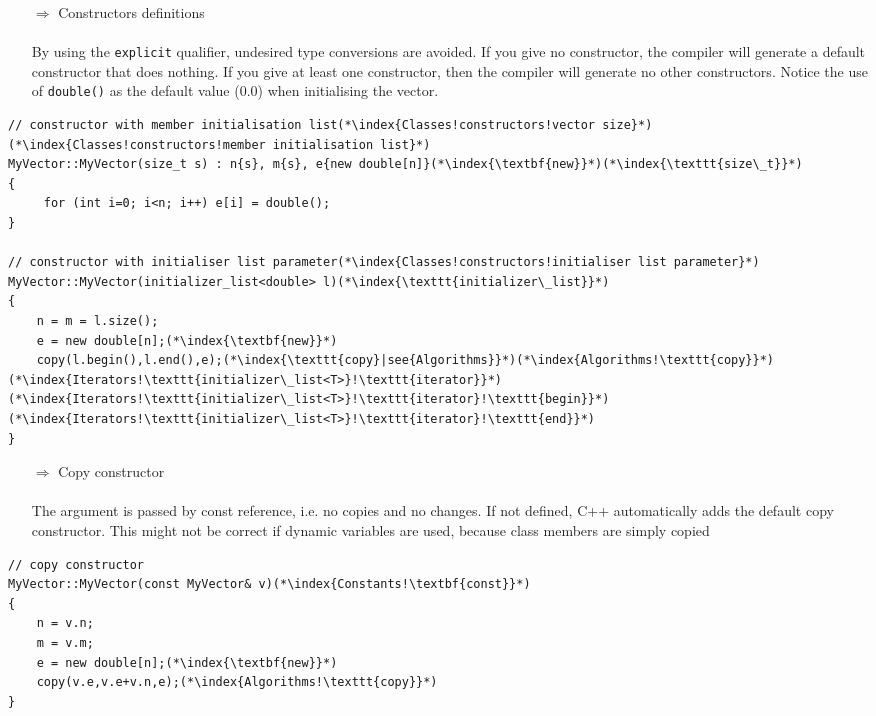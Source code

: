 \documentclass[10pt]{article}
\begin{document}
\begin{enumerate}
\item[$\Rightarrow$] Constructors definitions\\ \\ By using the \texttt{explicit} qualifier, undesired type conversions are avoided. If you give no constructor, the compiler will generate a default constructor that does nothing.
If you give at least one constructor, then the compiler will generate no other constructors. Notice the use of \texttt{double()} as the default value (0.0)
when initialising the vector.
\end{enumerate}
\begin{lstlisting}
// constructor with member initialisation list(*\index{Classes!constructors!vector size}*)(*\index{Classes!constructors!member initialisation list}*)
MyVector::MyVector(size_t s) : n{s}, m{s}, e{new double[n]}(*\index{\textbf{new}}*)(*\index{\texttt{size\_t}}*)
{
     for (int i=0; i<n; i++) e[i] = double();
}

// constructor with initialiser list parameter(*\index{Classes!constructors!initialiser list parameter}*)
MyVector::MyVector(initializer_list<double> l)(*\index{\texttt{initializer\_list}}*)
{
    n = m = l.size();
    e = new double[n];(*\index{\textbf{new}}*)
    copy(l.begin(),l.end(),e);(*\index{\texttt{copy}|see{Algorithms}}*)(*\index{Algorithms!\texttt{copy}}*)(*\index{Iterators!\texttt{initializer\_list<T>}!\texttt{iterator}}*)(*\index{Iterators!\texttt{initializer\_list<T>}!\texttt{iterator}!\texttt{begin}}*)(*\index{Iterators!\texttt{initializer\_list<T>}!\texttt{iterator}!\texttt{end}}*)
}
\end{lstlisting}
\begin{enumerate}
\item[$\Rightarrow$] Copy constructor\\ \\ The argument is passed by const reference, i.e. no copies and no changes. If not defined, C++ automatically adds the default copy
constructor. This might not be correct if dynamic variables are used,
because class members are simply copied
\end{enumerate}
\begin{lstlisting}
// copy constructor
MyVector::MyVector(const MyVector& v)(*\index{Constants!\textbf{const}}*)
{
    n = v.n;
    m = v.m;
    e = new double[n];(*\index{\textbf{new}}*)
    copy(v.e,v.e+v.n,e);(*\index{Algorithms!\texttt{copy}}*)
}
\end{lstlisting}
\end{document}
